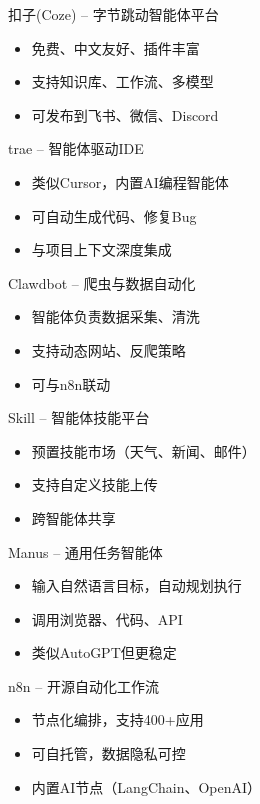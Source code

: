 \begin{frame}{扣子(Coze) – 字节跳动智能体平台}
\begin{itemize}
    \item 免费、中文友好、插件丰富
    \item 支持知识库、工作流、多模型
    \item 可发布到飞书、微信、Discord
\end{itemize}
\end{frame}

\begin{frame}{trae – 智能体驱动IDE}
\begin{itemize}
    \item 类似Cursor，内置AI编程智能体
    \item 可自动生成代码、修复Bug
    \item 与项目上下文深度集成
\end{itemize}
\end{frame}

\begin{frame}{Clawdbot – 爬虫与数据自动化}
\begin{itemize}
    \item 智能体负责数据采集、清洗
    \item 支持动态网站、反爬策略
    \item 可与n8n联动
\end{itemize}
\end{frame}

\begin{frame}{Skill – 智能体技能平台}
\begin{itemize}
    \item 预置技能市场（天气、新闻、邮件）
    \item 支持自定义技能上传
    \item 跨智能体共享
\end{itemize}
\end{frame}

\begin{frame}{Manus – 通用任务智能体}
\begin{itemize}
    \item 输入自然语言目标，自动规划执行
    \item 调用浏览器、代码、API
    \item 类似AutoGPT但更稳定
\end{itemize}
\end{frame}

\begin{frame}{n8n – 开源自动化工作流}
\begin{itemize}
    \item 节点化编排，支持400+应用
    \item 可自托管，数据隐私可控
    \item 内置AI节点（LangChain、OpenAI）
\end{itemize}
\end{frame}

